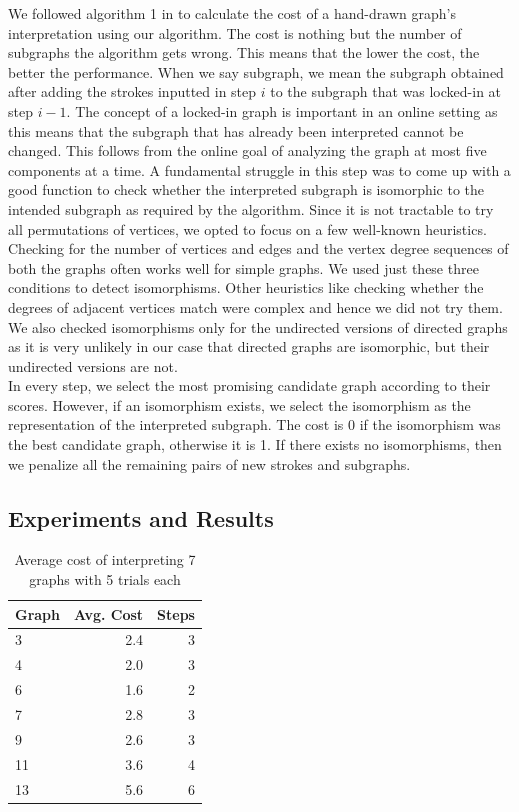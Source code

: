 We followed algorithm 1 in \cite{daly2015hand} to calculate the cost of a hand-drawn graph's interpretation using our algorithm. The cost is nothing but the number of subgraphs the algorithm gets wrong. This means that the lower the cost, the better the performance. When we say subgraph, we mean the subgraph obtained after adding the strokes inputted in step $i$ to the subgraph that was locked-in at step $i-1$. The concept of a locked-in graph is important in an online setting as this means that the subgraph that has already been interpreted cannot be changed. This follows from the online goal of analyzing the graph at most five components at a time. A fundamental struggle in this step was to come up with a good function to check whether the interpreted subgraph is isomorphic to the intended subgraph as required by the algorithm. Since it is not tractable to try all permutations of vertices, we opted to focus on a few well-known heuristics. Checking for the number of vertices and edges and the vertex degree sequences of both the graphs often works well for simple graphs. We used just these three conditions to detect isomorphisms. Other heuristics like checking whether the degrees of adjacent vertices match were complex and hence we did not try them. We also checked isomorphisms only for the undirected versions of directed graphs as it is very unlikely in our case that directed graphs are isomorphic, but their undirected versions are not.\\

In every step, we select the most promising candidate graph according to their scores. However, if an isomorphism exists, we select the isomorphism as the representation of the interpreted subgraph. The cost is 0 if the isomorphism was the best candidate graph, otherwise it is 1. If there exists no isomorphisms, then we penalize all the remaining pairs of new strokes and subgraphs.\\

\subsection{Experiments and Results}

\begin{table}[!htb] %
    \centering
    \begin{tabular}{lrr}
    \toprule
       Graph & Avg. Cost & Steps \\ %
         \midrule
3  & 2.4 & 3  \\ 
4 & 2.0 & 3 \\
6 & 1.6 & 2 \\
7 & 2.8 & 3 \\
9 & 2.6 & 3 \\
11 & 3.6 & 4 \\
13 & 5.6 & 6 \\
         \bottomrule
    \end{tabular}
    \caption{Average cost of interpreting 7 graphs with 5 trials each}
    \label{tab:table_cost}
\end{table}

